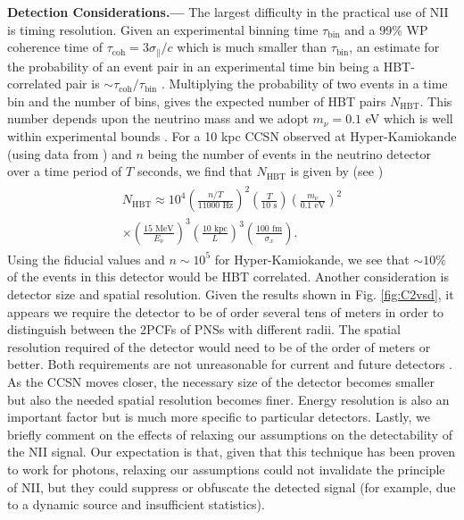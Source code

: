 \documentclass[aps,prl,reprint,floatfix
]{revtex4-1}
\newcommand{\heading}[1]{\textbf{#1.---}}
\begin{document}
\heading{Detection Considerations}
The largest difficulty in the practical use of NII is timing resolution. Given an experimental binning time $\tau_\text{bin}$ and a 99\% WP coherence time of $\tau_\text{coh}=3\sigma_\parallel/c$ which is much smaller than $\tau_\text{bin}$, an estimate for the probability of an event pair in an experimental time bin being a HBT-correlated pair is $\sim\tau_\text{coh}/\tau_\text{bin}$ \cite{1998AcPPB..29.1839B}. Multiplying the probability of two events in a time bin and the number of bins, gives the expected number of HBT pairs $N_\text{HBT}$. This number depends upon the neutrino mass and we adopt $m_\nu=0.1$ eV which is well within experimental bounds \cite{Olive:2016xmw}. For a 10 kpc CCSN observed at Hyper-Kamiokande (using data from \cite{2012ARNPS..62...81S}) and $n$ being the number of events in the neutrino detector over a time period of $T$ seconds, we find that $N_\text{HBT}$ is given by (see \cite{SupplementalMaterial})
\begin{align}\begin{aligned}
	N_\text{HBT}\approx
    10^4
    	\left(\frac{n/T}{11000\text{ Hz}}\right)^2
    	\left(\frac{T}{10\text{ s}} \right)
    	\left(\frac{m_\nu}{0.1\text{ eV}}\right)^2
        \\\times
    	\left(\frac{15\text{ MeV}}{E_\nu}\right)^3
    	\left(\frac{10\text{ kpc}}{L}\right)^3
    	\left(\frac{100\text{ fm}}{\sigma_x}\right).
\end{aligned}\end{align}
Using the fiducial values and $n\sim 10^5$ for Hyper-Kamiokande, we see that $\sim 10\%$ of the events in this detector would be HBT correlated. 
Another consideration is detector size and spatial resolution. Given the results shown in Fig. \ref{fig:C2vsd}, it appears we require the detector to be of order several tens of meters in order to distinguish between the 2PCFs of PNSs with different radii. The spatial resolution required of the detector would need to be of the order of meters or better. Both requirements are not unreasonable for current and future detectors \cite{2011arXiv1109.3262A,2016arXiv160301843A}.
As the CCSN moves closer, the necessary size of the detector becomes smaller but also the needed spatial resolution becomes finer. 
Energy resolution is also an important factor but is much more specific to particular detectors. 
Lastly, we briefly comment on the effects of relaxing our assumptions on the detectability of the NII signal. Our expectation is that, given that this technique has been proven to work for photons, relaxing our assumptions could not invalidate the principle of NII, but they could suppress or obfuscate the detected signal (for example, due to a dynamic source and insufficient statistics).
\end{document}

